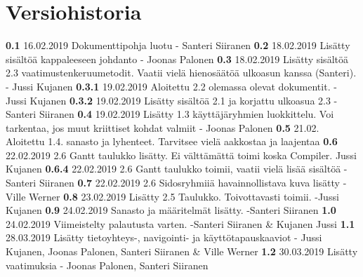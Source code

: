 \chapter*{Versiohistoria}

\newcommand{\currentversion}{2.0} %

\textbf{0.1} 16.02.2019 Dokumenttipohja luotu - Santeri Siiranen \newline
\textbf{0.2} 18.02.2019 Lisätty sisältöä kappaleeseen johdanto - Joonas Palonen \newline
\textbf{0.3} 18.02.2019 Lisätty sisältöä 2.3 vaatimustenkeruumetodit. Vaatii vielä hienosäätöä ulkoasun kanssa (Santeri). - Jussi Kujanen \newline
\textbf{0.3.1} 19.02.2019 Aloitettu 2.2 olemassa olevat dokumentit. - Jussi Kujanen \newline
\textbf{0.3.2} 19.02.2019 Lisätty sisältöä 2.1 ja korjattu ulkoasua 2.3 - Santeri Siiranen \newline
\textbf{0.4} 19.02.2019 Lisätty 1.3 käyttäjäryhmien luokkittelu. Voi tarkentaa, jos muut kriittiset kohdat valmiit - Joonas Palonen \newline
\textbf{0.5} 21.02. Aloitettu 1.4. sanasto ja lyhenteet. Tarvitsee vielä aakkostaa ja laajentaa \newline
\textbf{0.6} 22.02.2019 2.6 Gantt taulukko lisätty. Ei välttämättä toimi koska Compiler. Jussi Kujanen \newline
\textbf{0.6.4} 22.02.2019 2.6 Gantt taulukko toimii, vaatii vielä lisää sisältöä - Santeri Siiranen \newline
\textbf{0.7} 22.02.2019 2.6 Sidosryhmiiä havainnollistava kuva lisätty - Ville Werner \newline
\textbf{0.8} 23.02.2019 Lisätty 2.5 Taulukko. Toivottavasti toimii. -Jussi Kujanen \newline
\textbf{0.9} 24.02.2019 Sanasto ja määritelmät lisätty. -Santeri Siiranen \newline
\textbf{1.0} 24.02.2019 Viimeistelty palautusta varten. -Santeri Siiranen \& Kujanen Jussi \newline 
\textbf{1.1} 28.03.2019 Lisätty tietoyhteys-, navigointi- ja käyttötapauskaaviot - Jussi Kujanen, Joonas Palonen, Santeri Siiranen \& Ville Werner \newline 
\textbf{1.2} 30.03.2019 Lisätty vaatimuksia - Joonas Palonen, Santeri Siiranen\newline 

